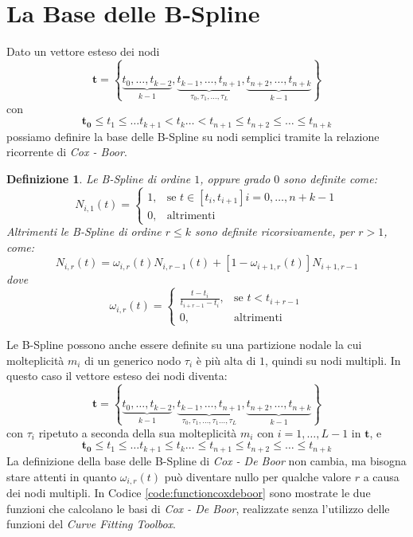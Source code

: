 \documentclass[a4paper, 10pt]{article}
\newtheorem{mydef}{Definizione}
\begin{document}
\section{La Base delle B-Spline}

Dato un vettore esteso dei nodi
$$ \mathbf{t} =  \left\{ \underbrace{t_{0}, \dots, t_{k-2}}_{k-1}, \underbrace{t_{k-1}, \dots, t_{n+1}}_{\tau_0, \tau_1, \dots, \tau_L}, \underbrace{t_{n+2}, \dots, t_{n+k}}_{k-1} \right\} $$
con
$$\mathbf{t_0} \leq t_1 \leq \dots t_{k+1} < t_k \dots < t_{n+1} \leq t_{n+2} \leq \dots \leq t_{n+k}$$
possiamo definire la base delle B-Spline su nodi semplici tramite la relazione ricorrente di \textit{Cox - Boor}.
\begin{mydef}
  Le B-Spline di ordine $1$, oppure grado $0$ sono definite come:
$$N_{i, 1}(t) = \begin{cases} 1, & \text{se } t\in[t_i, t_{i+1}] i = 0, \dots, n+k-1 \\ 0, & \text{altrimenti} \end{cases}$$
  Altrimenti le B-Spline di ordine $r \leq k$ sono definite ricorsivamente, per $r > 1$, come:
  $$N_{i, r}(t) = \omega_{i,r}(t)N_{i, r-1}(t) + [1-\omega_{i+1, r}(t)]N_{i+1, r-1}$$
  dove
$$\omega_{i,r}(t) = \begin{cases} \frac{t-t_i}{t_{i+r-1}-t_i}, & \text{se } t<t_{i+r-1} \\ 0, & \text{altrimenti} \end{cases}$$
\end{mydef}
Le B-Spline possono anche essere definite su una partizione nodale la cui molteplicità $m_i$ di un generico nodo $\tau_i$ è più alta di $1$,
quindi su nodi multipli. In questo caso il vettore esteso dei nodi diventa:
$$ \mathbf{t} =  \left\{ \underbrace{t_{0}, \dots, t_{k-2}}_{k-1}, \underbrace{t_{k-1}, \dots, t_{n+1}}_{\tau_0, \tau_1, \dots, \tau_1 \dots, \tau_L}, \underbrace{t_{n+2}, \dots, t_{n+k}}_{k-1} \right\} $$
con $\tau_i$ ripetuto a seconda della sua molteplicità $m_i$ con $i = 1, \dots, L-1$ in $\mathbf{t}$, e
$$\mathbf{t_0} \leq t_1 \leq \dots t_{k+1} \leq  t_k \dots \leq  t_{n+1} \leq t_{n+2} \leq \dots \leq t_{n+k}$$
La definizione della base delle B-Spline di \textit{Cox - De Boor} non cambia, ma bisogna stare attenti in quanto 
$\omega_{i,r}(t)$ può diventare nullo per qualche valore $r$  a causa dei nodi multipli.
In Codice \ref{code:functioncoxdeboor} sono mostrate le due funzioni che calcolano le basi di \textit{Cox - De Boor}, realizzate senza l'utilizzo delle funzioni del 
\textit{Curve Fitting Toolbox}.

\end{document}
